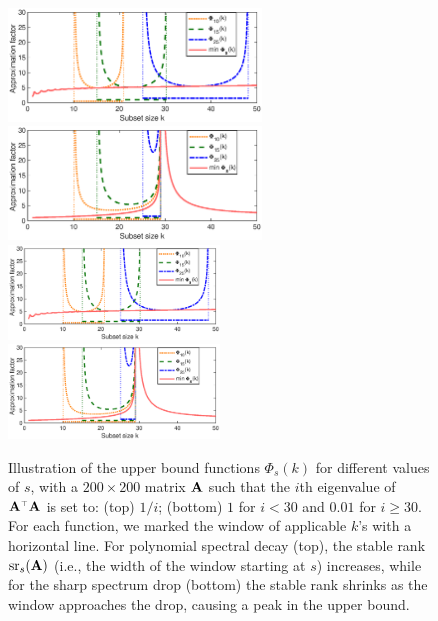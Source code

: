 \documentclass{article}
\begin{document}
\begin{figure}
  \centering
  \ifisarxiv
  \includegraphics[width=0.6\textwidth]{figs/nystrom/sliding}
  \includegraphics[width=0.6\textwidth]{figs/nystrom/sliding-peak}
\else  
  \includegraphics[width=0.5\textwidth]{figs/nystrom/sliding}
  \includegraphics[width=0.5\textwidth]{figs/nystrom/sliding-peak}
  \vspace{-6mm}
  \fi
  \caption{Illustration of the upper bound functions $\Phi_s(k)$ for
    different values of $s$, with a $200\times 200$ matrix $\mathbf A$ such
    that the $i$th eigenvalue of $\A^\top\A$ is set to:
  (top)  $1/i$; (bottom) $1$ for $i<30$ and $0.01$ for $i\geq 30$. For each
    function, we marked the window of applicable $k$'s with a
    horizontal line. For polynomial spectral decay (top), the stable rank
    ${\mathrm{sr}}_s(\mathbf A)$ (i.e., the width of the window starting at $s$)
    increases, while for the sharp spectrum drop (bottom) the stable
    rank shrinks as the window approaches the drop, causing a peak in
    the upper bound.}\vspace{-2mm}
  \label{f:sliding}
\end{figure}
\end{document}
